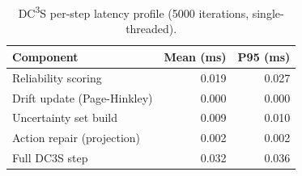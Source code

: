 \begin{table}[htbp]
\centering\small
\caption{DC\textsuperscript{3}S per-step latency profile (5000 iterations, single-threaded).}
\label{tab:dc3s_latency}
\begin{tabular}{lrr}
\toprule
Component & Mean (ms) & P95 (ms) \\
\midrule
  Reliability scoring & 0.019 & 0.027 \\
  Drift update (Page-Hinkley) & 0.000 & 0.000 \\
  Uncertainty set build & 0.009 & 0.010 \\
  Action repair (projection) & 0.002 & 0.002 \\
  Full DC3S step & 0.032 & 0.036 \\
\bottomrule
\end{tabular}
\end{table}
